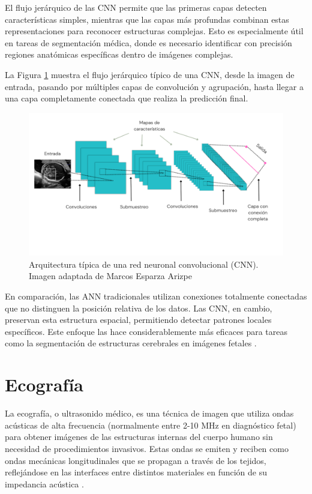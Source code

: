 El flujo jerárquico de las CNN permite que las primeras capas detecten características simples, mientras que las capas más profundas combinan estas representaciones para reconocer estructuras complejas. Esto es especialmente útil en tareas de segmentación médica, donde es necesario identificar con precisión regiones anatómicas específicas dentro de imágenes complejas. 

La Figura \ref{fig:cnn_arquitectura} muestra el flujo jerárquico típico de una CNN, desde la imagen de entrada, pasando por múltiples capas de convolución y agrupación, hasta llegar a una capa completamente conectada que realiza la predicción final.

\begin{figure}[h]
    \centering
    \includegraphics[width= \textwidth]{img/cnn.png}
    \caption{Arquitectura típica de una red neuronal convolucional (CNN). Imagen adaptada de Marcos Esparza Arizpe \cite{cnnimagen}}
    \label{fig:cnn_arquitectura}
\end{figure}

En comparación, las ANN tradicionales utilizan conexiones totalmente conectadas que no distinguen la posición relativa de los datos. Las CNN, en cambio, preservan esta estructura espacial, permitiendo detectar patrones locales específicos. Este enfoque las hace considerablemente más eficaces para tareas como la segmentación de estructuras cerebrales en imágenes fetales \cite{ajmal2018cnn}.


\section{Ecografía}
La ecografía, o ultrasonido médico, es una técnica de imagen que utiliza ondas acústicas de alta frecuencia (normalmente entre 2-10 MHz en diagnóstico fetal) para obtener imágenes de las estructuras internas del cuerpo humano sin necesidad de procedimientos invasivos. Estas ondas se emiten y reciben como ondas mecánicas longitudinales que se propagan a través de los tejidos, reflejándose en las interfaces entre distintos materiales en función de su impedancia acústica \cite{leigthon2007ultrasound}.

